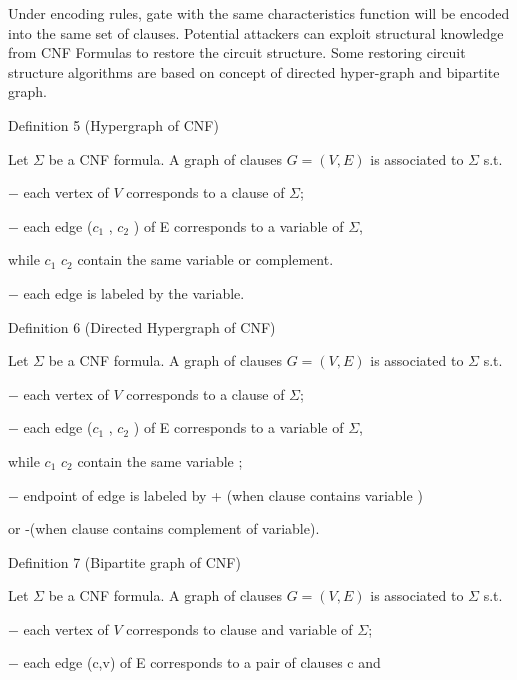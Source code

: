 \documentclass[runningheads,a4paper]{llncs}
\begin{document}
Under encoding rules, gate with the same characteristics function will be encoded into the same set of clauses. 
Potential attackers can exploit structural knowledge from CNF Formulas to restore the circuit structure. 
Some restoring circuit structure algorithms are based on concept of directed hyper-graph and bipartite graph.	

\noindent \newline Definition 5 (Hypergraph of CNF)

\setlength{\parindent}{1em} Let $\Sigma$ be a CNF formula. A graph of clauses $G=(V,E)$ is associated to $\Sigma$ s.t.

\setlength{\parindent}{4em}  $-$ each vertex of $V$ corresponds to a clause of  $\Sigma$;

\setlength{\parindent}{4em}  $-$ each edge ($c_1$ , $c_2$ ) of E corresponds to a variable of $\Sigma$, 

\setlength{\parindent}{5em} while $c_1$ $c_2$ contain the same variable or complement.

\setlength{\parindent}{4em}  $-$ each edge is labeled by the variable.
 
\noindent \newline Definition 6 (Directed Hypergraph of CNF)

\setlength{\parindent}{1em} Let $\Sigma$ be a CNF formula. A graph of clauses $G=(V,E)$ is associated to $\Sigma$ s.t.

\setlength{\parindent}{4em} $-$ each vertex of $V$ corresponds to a clause of $\Sigma$;

\setlength{\parindent}{4em} $-$ each edge ($c_1$ , $c_2$ ) of E corresponds to a variable of $\Sigma$,

\setlength{\parindent}{5em} while $c_1$ $c_2$ contain the same variable ;

\setlength{\parindent}{4em} $-$ endpoint of edge is labeled by + (when clause contains variable ) 

\setlength{\parindent}{5em} or -(when clause contains complement of variable).

\noindent \newline Definition 7 (Bipartite graph of CNF)

\setlength{\parindent}{1em} Let $\Sigma$ be a CNF formula. A graph of clauses $G=(V,E)$ is associated to $\Sigma$ s.t.

\setlength{\parindent}{4em} $-$ each vertex of $V$ corresponds to clause and variable of $\Sigma$;

\setlength{\parindent}{4em} $-$ each edge (c,v) of E corresponds to a pair of clauses c and
\end{document}
